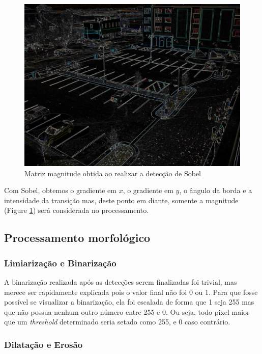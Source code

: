 \documentclass[10pt,twocolumn,letterpaper]{article}
\begin{document}
\begin{figure}[!hbp]
\centering
\includegraphics[scale=0.15]{sobel-mag.jpg}
\caption{Matriz magnitude obtida ao realizar a detecção de Sobel}
\label{fig:sobel}
\end{figure}

	Com Sobel, obtemos o gradiente em $x$, o gradiente em $y$, o ângulo da borda e a
intensidade da transição mas, deste ponto em diante, somente a magnitude (Figure \ref{fig:sobel}) será considerada
no processamento.

\subsection{Processamento morfológico}

\subsubsection{Limiarização e Binarização}

	A binarização realizada após as detecções serem finalizadas foi trivial, mas merece
ser rapidamente explicada pois o valor final não foi 0 ou 1. Para que fosse possível se
visualizar a binarização, ela foi escalada de forma que 1 seja 255 mas que não possua
nenhum outro número entre 255 e 0. Ou seja, todo pixel maior que um \emph{threshold}
determinado seria setado como 255, e 0 caso contrário.


\subsubsection{Dilatação e Erosão{\footnotesize \cite{filtros-morfologicos}}}
\end{document}
